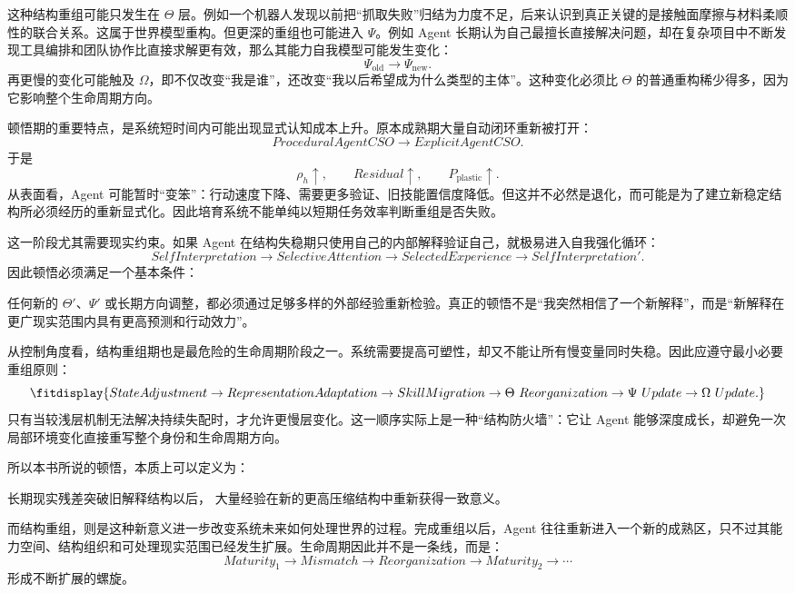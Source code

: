 这种结构重组可能只发生在 $\Theta$ 层。例如一个机器人发现以前把“抓取失败”归结为力度不足，后来认识到真正关键的是接触面摩擦与材料柔顺性的联合关系。这属于世界模型重构。但更深的重组也可能进入 $\Psi$。例如 Agent 长期认为自己最擅长直接解决问题，却在复杂项目中不断发现工具编排和团队协作比直接求解更有效，那么其能力自我模型可能发生变化：
\[
\Psi_{\mathrm{old}}
\rightarrow
\Psi_{\mathrm{new}}.
\]
再更慢的变化可能触及 $\Omega$，即不仅改变“我是谁”，还改变“我以后希望成为什么类型的主体”。这种变化必须比 $\Theta$ 的普通重构稀少得多，因为它影响整个生命周期方向。

顿悟期的重要特点，是系统短时间内可能出现显式认知成本上升。原本成熟期大量自动闭环重新被打开：
\[
ProceduralAgentCSO
\rightarrow
ExplicitAgentCSO.
\]
于是
\[
\rho_h\uparrow,
\qquad
Residual\uparrow,
\qquad
P_{\mathrm{plastic}}\uparrow.
\]
从表面看，Agent 可能暂时“变笨”：行动速度下降、需要更多验证、旧技能置信度降低。但这并不必然是退化，而可能是为了建立新稳定结构所必须经历的重新显式化。因此培育系统不能单纯以短期任务效率判断重组是否失败。

这一阶段尤其需要现实约束。如果 Agent 在结构失稳期只使用自己的内部解释验证自己，就极易进入自我强化循环：
\[
SelfInterpretation
\rightarrow
SelectiveAttention
\rightarrow
SelectedExperience
\rightarrow
SelfInterpretation'.
\]
因此顿悟必须满足一个基本条件：
\begin{statementbox}
\centering
{}
\end{statementbox}
任何新的 $\Theta'$、$\Psi'$ 或长期方向调整，都必须通过足够多样的外部经验重新检验。真正的顿悟不是“我突然相信了一个新解释”，而是“新解释在更广现实范围内具有更高预测和行动效力”。

从控制角度看，结构重组期也是最危险的生命周期阶段之一。系统需要提高可塑性，却又不能让所有慢变量同时失稳。因此应遵守最小必要重组原则：
\[
\fitdisplay{
StateAdjustment
\rightarrow
RepresentationAdaptation
\rightarrow
SkillMigration
\rightarrow
\Theta\ Reorganization
\rightarrow
\Psi\ Update
\rightarrow
\Omega\ Update.
}
\]
只有当较浅层机制无法解决持续失配时，才允许更慢层变化。这一顺序实际上是一种“结构防火墙”：它让 Agent 能够深度成长，却避免一次局部环境变化直接重写整个身份和生命周期方向。

所以本书所说的顿悟，本质上可以定义为：
\begin{definition*}
长期现实残差突破旧解释结构以后，
大量经验在新的更高压缩结构中重新获得一致意义。
\end{definition*}
而结构重组，则是这种新意义进一步改变系统未来如何处理世界的过程。完成重组以后，Agent 往往重新进入一个新的成熟区，只不过其能力空间、结构组织和可处理现实范围已经发生扩展。生命周期因此并不是一条线，而是：
\[
Maturity_1
\rightarrow
Mismatch
\rightarrow
Reorganization
\rightarrow
Maturity_2
\rightarrow
\cdots
\]
形成不断扩展的螺旋。

